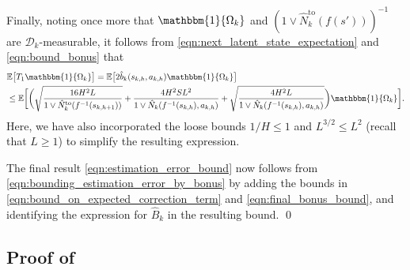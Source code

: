 \documentclass[11pt]{article}
\newcommand{\mcD}{\mathcal{D}}
\newcommand{\mbbE}{\mathbb{E}}
\theoremstyle{definition}
\theoremstyle{definition}
\begin{document}
Finally, noting once more that $\mathbbm{1}\{\Omega_k\}$ and $(1\vee \hat{N}^{\mathrm{to}}_k(f(s')))^{-1}$ are $\mcD_k$-measurable, it follows from \eqref{eqn:next_latent_state_expectation} and \eqref{eqn:bound_bonus} that
\begin{align}
	\label{eqn:final_bonus_bound}
		&
	\mbbE\bigl[T_1\mathbbm{1}\{\Omega_k\}\bigr]
	=
	\mbbE\bigl[2\hat{b}_k(s_{k,h},a_{k,h})\mathbbm{1}\{\Omega_k\}\bigr]
	\\
		&
	\leq
	\mbbE\biggl[
	\biggl(
	\sqrt{\frac{16H^2L}{1\vee \hat{N}^{\mathrm{to}}_k(f^{-1}(s_{k,h+1}))}}
	+
	\frac{4H^2SL^{2}}{1\vee\hat{N}_k(f^{-1}(s_{k,h}),a_{k,h})}
	+
	\sqrt{\frac{4H^2 L}{1\vee\hat{N}_k(f^{-1}(s_{k,h}), a_{k,h})}}
	\biggr)
	\mathbbm{1}\{\Omega_k\}
	\biggr].
	\nonumber
\end{align}
Here, we have also incorporated the loose bounds $1/H\leq 1$ and $L^{3/2}\leq L^2$ (recall that $L\geq 1$) to simplify the resulting expression.

The final result \eqref{eqn:estimation_error_bound} now follows from \eqref{eqn:bounding_estimation_error_by_bonus} by adding the bounds in \eqref{eqn:bound_on_expected_correction_term} and \eqref{eqn:final_bonus_bound}, and identifying the expression for $\hat{B}_k$ in the resulting bound.
\qed

\subsection{Proof of \texorpdfstring{}{the recursive sum lemma}}
\label{sec:proof_of_recursive_sum}
\end{document}
